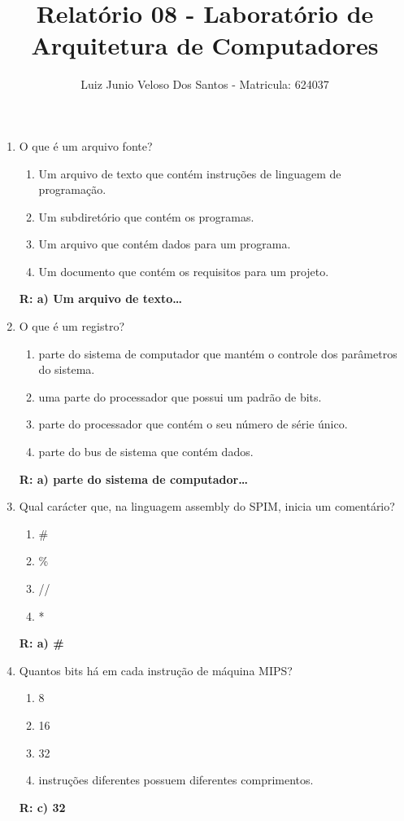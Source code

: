 \documentclass[a4paper,11pt]{article}
\title{\vspace{-4cm}Relatório 08 - Laboratório de Arquitetura de Computadores}
\author{Luiz Junio Veloso Dos Santos - Matricula: 624037}
\begin{document}
 

\maketitle

\begin{enumerate}
    \item{O que é um arquivo fonte?}
        \begin{enumerate}
            \item{Um arquivo de texto que contém instruções de linguagem de programação.}
            \item{Um subdiretório que contém os programas.}
            \item{Um arquivo que contém dados para um programa.}
            \item{Um documento que contém os requisitos para um projeto.}
        \end{enumerate}
        \textbf{R: a) Um arquivo de texto\dots}

    \item{O que é um registro?}
        \begin{enumerate}
            \item{parte do sistema de computador que mantém o controle dos parâmetros do sistema.}
            \item{uma parte do processador que possui um padrão de bits.}
            \item{parte do processador que contém o seu número de série único.}
            \item{parte do bus de sistema que contém dados.}
        \end{enumerate}
        \textbf{R: a) parte do sistema de computador\dots}

    \item{Qual carácter que, na linguagem assembly do SPIM, inicia um comentário?}
        \begin{enumerate}
            \item{\#}
            \item{\%}
            \item{//}
            \item{*}
        \end{enumerate}
        \textbf{R: a) \#}

    \item{Quantos bits há em cada instrução de máquina MIPS?}
        \begin{enumerate}
            \item{8}
            \item{16}
            \item{32}
            \item{instruções diferentes possuem diferentes comprimentos.}
        \end{enumerate}
        \textbf{R: c) 32}


\end{enumerate}
\end{document}
